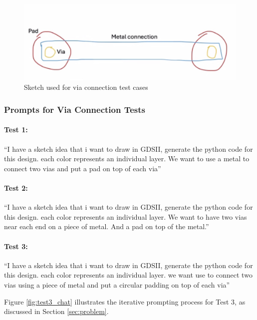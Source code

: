 \documentclass{article}
\begin{document}
\begin{figure}[ht]
\centering
\includegraphics[width=0.5\linewidth]{sketch.png}
\caption{Sketch used for via connection test cases}
\label{fig:sketch}
\end{figure}

\subsubsection{Prompts for Via Connection Tests}
\label{appendix:via_prompts}

\paragraph{Test 1:} ``I have a sketch idea that i want to draw in GDSII, generate the python code for this design. each color represents an individual layer. We want to use a metal to connect two vias and put a pad on top of each via''

\paragraph{Test 2:} ``I have a sketch idea that i want to draw in GDSII, generate the python code for this design. each color represents an individual layer. We want to have two vias near each end on a piece of metal. And a pad on top of the metal.''

\paragraph{Test 3:} ``I have a sketch idea that i want to draw in GDSII, generate the python code for this design. each color represents an individual layer. we want use to connect two vias using a piece of metal and put a circular padding on top of each via''

Figure \ref{fig:test3_chat} illustrates the iterative prompting process for Test 3, as discussed in Section \ref{sec:problem}.
\end{document}
